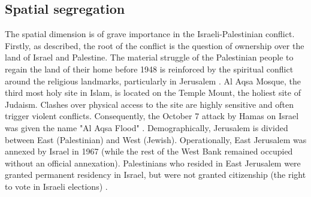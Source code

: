 \documentclass[dissertation,math,vertlayout,pdfa,colorlinks,nologo]{aaltoseries}
\begin{document}
\subsection{Spatial segregation}
The spatial dimension is of grave importance in the Israeli-Palestinian conflict. Firstly, as described, the root of the conflict is the question of ownership over the land of Israel and Palestine. The material struggle of the Palestinian people to regain the land of their home before 1948 is reinforced by the spiritual conflict around the religious landmarks, particularly in Jerusalem \cite{kleinJerusalem2022}. Al Aqsa Mosque, the third most holy site in Islam, is located on the Temple Mount, the holiest site of Judaism. Clashes over physical access to the site are highly sensitive and often trigger violent conflicts. Consequently, the October 7 attack by Hamas on Israel was given the name "Al Aqsa Flood" \cite{tarasiukGeostrategicImportanceTemple2023}. Demographically, Jerusalem is divided between East (Palestinian) and West (Jewish). Operationally, East Jerusalem was annexed by Israel in 1967 (while the rest of the West Bank remained occupied without an official annexation). Palestinians who resided in East Jerusalem were granted permanent residency in Israel, but were not granted citizenship (the right to vote in Israeli elections) \cite{kleinJerusalem2022}. 
\end{document}
